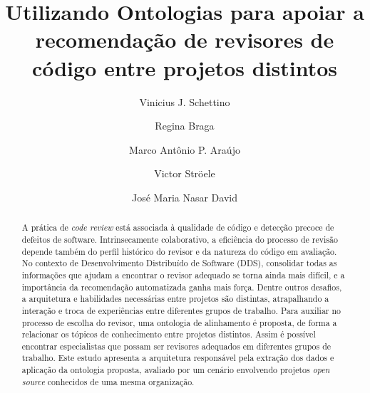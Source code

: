 \documentclass[peerreview]{acmart}
\begin{document}
\title{Utilizando Ontologias para apoiar a recomendação de revisores de código entre projetos distintos}

\author{Vinicius J. Schettino}

\author{Regina Braga}

\author{Marco Antônio P. Araújo}

\author{Victor Ströele}

\author{José Maria Nasar David}

\renewcommand{\shortauthors}{Schettino et al.}


\begin{abstract}
A prática de \textit{code review} está associada à qualidade de código e detecção precoce de defeitos de software. Intrinsecamente colaborativo, a eficiência do processo de revisão depende também do perfil histórico do revisor e da natureza do código em avaliação. No contexto de Desenvolvimento Distribuído de Software (DDS), consolidar todas as informações que ajudam a encontrar o revisor adequado se torna ainda mais difícil, e a importância da recomendação automatizada ganha mais força. Dentre outros desafios, a arquitetura e habilidades necessárias entre projetos são distintas, atrapalhando a interação e troca de experiências entre diferentes grupos de trabalho. Para auxiliar no processo de escolha do revisor, uma ontologia de alinhamento é proposta, de forma a relacionar os tópicos de conhecimento entre projetos distintos. Assim é possível encontrar especialistas que possam ser revisores adequados em diferentes grupos de trabalho. Este estudo apresenta a  arquitetura responsável pela extração dos dados e aplicação da ontologia proposta, avaliado por um cenário envolvendo projetos \textit{open source} conhecidos de uma mesma organização.
\end{abstract}
\end{document}
